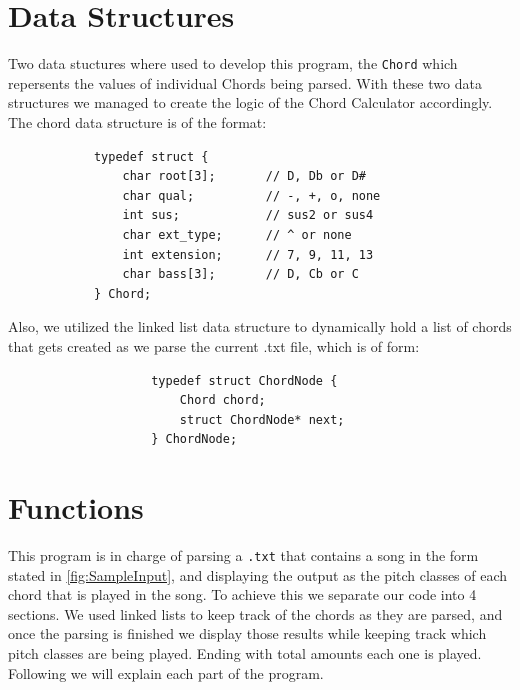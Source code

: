 \documentclass{article}
\begin{document}
\section{Data Structures}
Two data stuctures where used to develop this program, the \texttt{Chord} which repersents the values of individual Chords being parsed. With these two data structures we managed to create the logic of the Chord Calculator accordingly. The chord data structure is of the format:
\begin{lstlisting}
            typedef struct {
                char root[3];       // D, Db or D#
                char qual;          // -, +, o, none 
                int sus;            // sus2 or sus4
                char ext_type;      // ^ or none 
                int extension;      // 7, 9, 11, 13
                char bass[3];       // D, Cb or C
            } Chord;
\end{lstlisting}
Also, we utilized the linked list data structure to dynamically hold a list of chords that gets created as we parse the current .txt file, which is of form:
\begin{lstlisting}
                    typedef struct ChordNode {
                        Chord chord;
                        struct ChordNode* next;
                    } ChordNode;
\end{lstlisting}
\section{Functions} \label{fig:Functions}
This program is in charge of parsing a \texttt{.txt} that contains a song in the form stated in \ref{fig:SampleInput}, and displaying the output as the pitch classes of each chord that is played in the song. To achieve this we separate our code into 4 sections. We used linked lists to keep track of the chords as they are parsed, and once the parsing is finished we display those results while keeping track which pitch classes are being played. Ending with total amounts each one is played. Following we will explain each part of the program.
\end{document}
